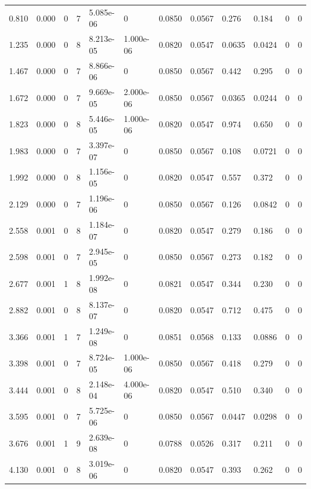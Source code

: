 \documentclass[preview]{standalone}
\begin{document}
{{\begin{tabular}{L{1.2cm}C{1.2cm} C{0.3cm}C{0.5cm} C{1.4cm}C{1.4cm} C{1.4cm}C{1.4cm} C{1.6cm}C{1.6cm} C{1.6cm}C{1.6cm}}
  0.810  &  0.000  & 0     &  7 &  5.085e-06  & 0  &  0.0850&   0.0567& 0.276 & 0.184   &  0 & 0  \\ 
  1.235  &  0.000  & 0     &  8 &  8.213e-05  & 1.000e-06  &  0.0820&   0.0547& 0.0635 & 0.0424   &  0 & 0  \\ 
  1.467  &  0.000  & 0     &  7 &  8.866e-06  & 0  &  0.0850&   0.0567& 0.442 & 0.295   &  0 & 0  \\ 
  1.672  &  0.000  & 0     &  7 &  9.669e-05  & 2.000e-06  &  0.0850&   0.0567& 0.0365 & 0.0244   &  0 & 0  \\ 
  1.823  &  0.000  & 0     &  8 &  5.446e-05  & 1.000e-06  &  0.0820&   0.0547& 0.974 & 0.650   &  0 & 0  \\ 
  1.983  &  0.000  & 0     &  7 &  3.397e-07  & 0  &  0.0850&   0.0567& 0.108 & 0.0721   &  0 & 0  \\ 
  1.992  &  0.000  & 0     &  8 &  1.156e-05  & 0  &  0.0820&   0.0547& 0.557 & 0.372   &  0 & 0  \\ 
  2.129  &  0.000  & 0     &  7 &  1.196e-06  & 0  &  0.0850&   0.0567& 0.126 & 0.0842   &  0 & 0  \\ 
  2.558  &  0.001  & 0     &  8 &  1.184e-07  & 0  &  0.0820&   0.0547& 0.279 & 0.186   &  0 & 0  \\ 
  2.598  &  0.001  & 0     &  7 &  2.945e-05  & 0  &  0.0850&   0.0567& 0.273 & 0.182   &  0 & 0  \\ 
  2.677  &  0.001  & 1     &  8 &  1.992e-08  & 0  &  0.0821&   0.0547& 0.344 & 0.230   &  0 & 0  \\ 
  2.882  &  0.001  & 0     &  8 &  8.137e-07  & 0  &  0.0820&   0.0547& 0.712 & 0.475   &  0 & 0  \\ 
  3.366  &  0.001  & 1     &  7 &  1.249e-08  & 0  &  0.0851&   0.0568& 0.133 & 0.0886   &  0 & 0  \\ 
  3.398  &  0.001  & 0     &  7 &  8.724e-05  & 1.000e-06  &  0.0850&   0.0567& 0.418 & 0.279   &  0 & 0  \\ 
  3.444  &  0.001  & 0     &  8 &  2.148e-04  & 4.000e-06  &  0.0820&   0.0547& 0.510 & 0.340   &  0 & 0  \\ 
  3.595  &  0.001  & 0     &  7 &  5.725e-06  & 0  &  0.0850&   0.0567& 0.0447 & 0.0298   &  0 & 0  \\ 
  3.676  &  0.001  & 1     &  9 &  2.639e-08  & 0  &  0.0788&   0.0526& 0.317 & 0.211   &  0 & 0  \\ 
  4.130  &  0.001  & 0     &  8 &  3.019e-06  & 0  &  0.0820&   0.0547& 0.393 & 0.262   &  0 & 0  \\ 

\end{tabular}}}
\end{document}
